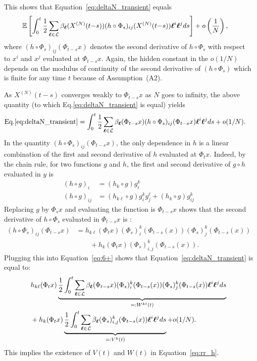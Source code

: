 \documentclass[sigconf]{acmart}
\newcommand\XN{X^{(N)}}
\newcommand\bl{{\text{\boldmath$\ell$}}}
\newcommand\calL{\mathcal{L}}
\newcommand\esp[1]{{\mathchoice{\besp{#1}}{\sesp{#1}}{\sesp{#1}}{\sesp{#1}}}}
\newcommand\besp[1]{\mathbb{E}\left[#1\right]}
\newcommand\sesp[1]{\mathbb{E}[#1]}
\newcommand\p[1]{\left(#1\right)}
\begin{document}
  This shows that Equation~\eqref{eq:deltaN_transient} equals
  \begin{align*}
    &\esp{\int_0^t\frac12\sum_{\bl\in\calL}\beta_\bl(\XN(t{-}s))(h\circ\Phi_s)_{ij} 
      (\XN(t{-}s)) \bl^i\bl^jds} + o\p{\frac1N},
  \end{align*}
  where $(h\circ\Phi_s)_{ij}(\Phi_{t-s}x)$ denotes the second
  derivative of $h\circ\Phi_s$ with respect to $x^i$ and $x^j$
  evaluated at $\Phi_{t-s}x$. Again, the hidden constant in the
  $o(1/N)$ depends on the modulus of continuity of the second
  derivative of $(h\circ\Phi_s)$ which is finite for any time $t$
  because of Assumption~(A2).

  As $\XN(t{-}s)$ converges weakly to $\Phi_{t-s}x$ as $N$ goes to
  infinity, the above quantity (to which
  Eq.\eqref{eq:deltaN_transient} is equal) yields
  \begin{align}
    \text{Eq.\eqref{eq:deltaN_transient}}
    &=\int_0^t\frac12\sum_{\bl\in\calL}\beta_\bl(\Phi_{t-s}x)(h\circ\Phi_s)_{ij}
      (\Phi_{t-s}x) \bl^i\bl^jds + o(1/N).
      \label{eq:6+}
  \end{align}
  In the quantity $(h\circ\Phi_s)_{ij}(\Phi_{t-s}x)$, the only
  dependence in $h$ is a linear combination of the first and second
  derivative of $h$ evaluated at $\Phi_tx$. Indeed, by the chain rule,
  for two functions $g$ and $h$, the first and second derivative of
  $g\circ h$ evaluated in $y$ is
  \begin{align*}
    (h\circ g)_{i}  &= (h_k\circ g)g^k_i \\
    (h\circ g)_{ij} &= (h_{k\ell}\circ g)g^{k}_ig^{\ell}_j +
                      (h_k\circ g)g^k_{ij} 
  \end{align*}
    Replacing $g$ by $\Phi_{s}x$ and evaluating the function is
  $\Phi_{t-s}x$ shows that the second derivative of $h\circ\Phi_s$
  evaluated in $\Phi_{t-s}x$ is : 
  \begin{align*}
    (h\circ\Phi_s)_{ij}(\Phi_{t-s}x)
    &= h_{k\ell}(\Phi_tx) (\Phi_s)^{k}_i(\Phi_{t-s}(x)) (\Phi_s)^k_j(\Phi_{t-s}(x)) \\
    &\qquad+ h_k(\Phi_tx)(\Phi_s)^{k}_{i,j}(\Phi_{t-s}(x)).
  \end{align*}
  Plugging this into Equation~\eqref{eq:6+} shows that
  Equation~\eqref{eq:deltaN_transient} is equal to:
  \begin{align*}
    & h_{k\ell}(\Phi_tx)
      \underbrace{\frac12\int_0^t\sum_{\bl\in\calL}\beta_\bl(\Phi_{t-s}x)
    (\Phi_s)^{k}_i(\Phi_{t-s}(x))
    (\Phi_s)^k_j(\Phi_{t-s}(x))\bl^i\bl^jds}_{=: W^{k\ell}(t)} \\
    &+h_k(\Phi_tx)\underbrace{\frac12\int_0^t\sum_{\bl\in\calL}\beta_\bl(\Phi_s)^{k}_{i,j}(\Phi_{t-s}(x))\bl^i\bl^jds}_{=:V^k(t)} + 
      o(1/N).
  \end{align*}
  This implies the existence of $V(t)$ and $W(t)$ in
  Equation~\eqref{eq:rr_h}.
\end{document}
